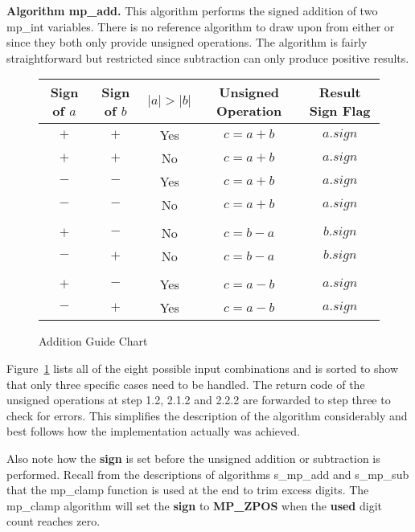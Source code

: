 \documentclass[b5paper]{book}
\begin{document}
\textbf{Algorithm mp\_add.}
This algorithm performs the signed addition of two mp\_int variables.  There is no reference algorithm to draw upon from 
either \cite{TAOCPV2} or \cite{HAC} since they both only provide unsigned operations.  The algorithm is fairly 
straightforward but restricted since subtraction can only produce positive results.

\begin{figure}[here]
\begin{small}
\begin{center}
\begin{tabular}{|c|c|c|c|c|}
\hline \textbf{Sign of $a$} & \textbf{Sign of $b$} & \textbf{$\vert a \vert > \vert b \vert $} & \textbf{Unsigned Operation} & \textbf{Result Sign Flag} \\
\hline $+$ & $+$ & Yes & $c = a + b$ & $a.sign$ \\
\hline $+$ & $+$ & No  & $c = a + b$ & $a.sign$ \\
\hline $-$ & $-$ & Yes & $c = a + b$ & $a.sign$ \\
\hline $-$ & $-$ & No  & $c = a + b$ & $a.sign$ \\
\hline &&&&\\

\hline $+$ & $-$ & No  & $c = b - a$ & $b.sign$ \\
\hline $-$ & $+$ & No  & $c = b - a$ & $b.sign$ \\

\hline &&&&\\

\hline $+$ & $-$ & Yes & $c = a - b$ & $a.sign$ \\
\hline $-$ & $+$ & Yes & $c = a - b$ & $a.sign$ \\

\hline
\end{tabular}
\end{center}
\end{small}
\caption{Addition Guide Chart}
\label{fig:AddChart}
\end{figure}

Figure~\ref{fig:AddChart} lists all of the eight possible input combinations and is sorted to show that only three 
specific cases need to be handled.  The return code of the unsigned operations at step 1.2, 2.1.2 and 2.2.2 are 
forwarded to step three to check for errors.  This simplifies the description of the algorithm considerably and best 
follows how the implementation actually was achieved.

Also note how the \textbf{sign} is set before the unsigned addition or subtraction is performed.  Recall from the descriptions of algorithms
s\_mp\_add and s\_mp\_sub that the mp\_clamp function is used at the end to trim excess digits.  The mp\_clamp algorithm will set the \textbf{sign}
to \textbf{MP\_ZPOS} when the \textbf{used} digit count reaches zero.
\end{document}

